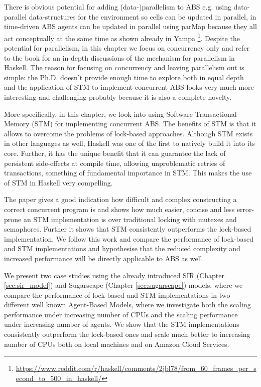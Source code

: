 There is obvious potential for adding (data-)parallelism to ABS e.g. using data-parallel data-structures for the environment so cells can be updated in parallel, in time-driven ABS agents can be updated in parallel using parMap because they all act conceptually at the same time as shown already in Yampa \footnote{\url{https://www.reddit.com/r/haskell/comments/2jbl78/from_60_frames_per_second_to_500_in_haskell/}}. Despite the potential for parallelism, in this chapter we focus on concurrency only and refer to the book \cite{marlow_parallel_2013} for an in-depth discussions of the mechanism for parallelism in Haskell. The reason for focusing on concurrency and leaving parallelism out is simple: the Ph.D. doesn't provide enough time to explore both in equal depth and the application of STM to implement concurrent ABS looks very much more interesting and challenging probably because it is also a complete novelty.

\medskip

More specifically, in this chapter, we look into using Software Transactional Memory (STM) for implementing concurrent ABS. The benefits of STM is that it allows to overcome the problems of lock-based approaches. Although STM exists in other languages as well, Haskell was one of the first to natively build it into its core. Further, it has the unique benefit that it can guarantee the lack of persistent side-effects at compile time, allowing unproblematic retries of transactions, something of fundamental importance in STM. This makes the use of STM in Haskell very compelling.

The paper \cite{discolo_lock_2006} gives a good indication how difficult and complex constructing a correct concurrent program is and shows how much easier, concise and less error-prone an STM implementation is over traditional locking with mutexes and semaphores. Further it shows that STM consistently outperforms the lock-based implementation. We follow this work and compare the performance of lock-based and STM implementations and hypothesise that the reduced complexity and increased performance will be directly applicable to ABS as well.

We present two case studies using the already introduced SIR (Chapter \ref{sec:sir_model}) and Sugarscape (Chapter \ref{sec:sugarscape}) models, where we compare the performance of lock-based and STM implementations in two different well known Agent-Based Models, where we investigate both the scaling performance under increasing number of CPUs and the scaling performance under increasing number of agents. We show that the STM implementations consistently outperform the lock-based ones and scale much better to increasing number of CPUs both on local machines and on Amazon Cloud Services.





